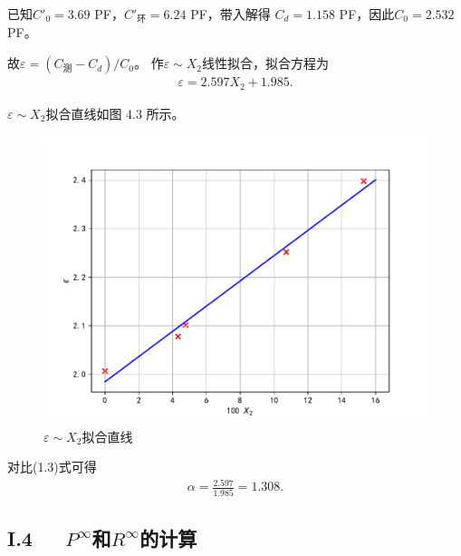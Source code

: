 \documentclass[12pt]{ctexart}
\numberwithin{equation}{section}
\begin{document}
已知$C'_0 = 3.69$ PF，$C'_\text{环} = 6.24$ PF，带入解得
$C_d = 1.158$ PF，因此$C_0 = 2.532$ PF。

故$\varepsilon = (C_\text{测} - C_d)/C_0$。
作$\varepsilon\sim X_2$线性拟合，拟合方程为
\begin{align}
    \varepsilon = 2.597 X_2 + 1.985. \tag{I.9}
\end{align}

$\varepsilon\sim X_2$拟合直线如图 4.3 所示。
\begin{figure}[!h]
    \centering
    \includegraphics[scale=0.7]{fitting_alpha.pdf}
    \caption{$\varepsilon\sim X_2$拟合直线}
\end{figure}

对比(1.3)式可得
\begin{align}
    \alpha = \frac{2.597}{1.985} = 1.308.
    \tag{I.10}
\end{align}

\subsection*{I.4~~~$P^{\infty}$和$R^{\infty}$的计算}
\end{document}
